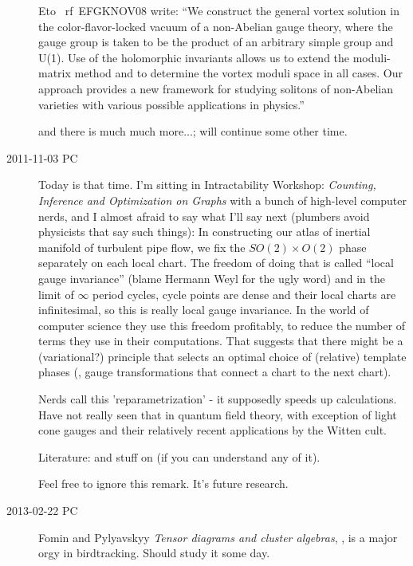 \begin{description}
Eto \etal~rf~{EFGKNOV08} write:
   ``We construct the general vortex solution in the color-flavor-locked
   vacuum of a non-Abelian gauge theory, where the gauge group is taken
   to be the product of an arbitrary simple group and U(1). Use of the
   holomorphic invariants allows us to extend the moduli-matrix method
   and to determine the vortex moduli space in all cases. Our approach
   provides a new framework for studying solitons of non-Abelian
   varieties with various possible applications in physics.''

and there is much much more...; will continue some other time.

\item[2011-11-03 PC] Today is that time. I'm sitting in
     {Intractability Workshop:}
     \emph{Counting, Inference and Optimization on Graphs}
with a bunch of high-level computer nerds, and I almost afraid to say
what I'll say next (plumbers avoid physicists that say such things): In
constructing our atlas of inertial manifold of turbulent pipe flow, we
fix the $SO(2) \times O(2)$ phase separately on each local chart. The
freedom of doing that is called ``local gauge invariance'' (blame Hermann
Weyl for the ugly word) and in the limit of $\infty$ period cycles, cycle
points are dense and their local charts are infinitesimal, so this is
really local gauge invariance. In the world of computer science they use
this freedom profitably, to reduce the number of terms they use in their
computations. That suggests that there might be a (variational?)
principle that selects an optimal choice of (relative) template phases
(\ie, gauge transformations that connect a chart to the next chart).

Nerds call this 'reparametrization' - it supposedly speeds up calculations.
Have not really seen that in quantum field theory, with exception of light
cone gauges and their relatively recent applications by the Witten cult.

Literature:  and stuff on
 (if you can understand any of it).

Feel free to ignore this remark. It's future research.

\item[2013-02-22 PC] Fomin and Pylyavskyy
{\em Tensor diagrams and cluster algebras}, {},
is a major orgy in birdtracking. Should study it some day.


\end{description}
